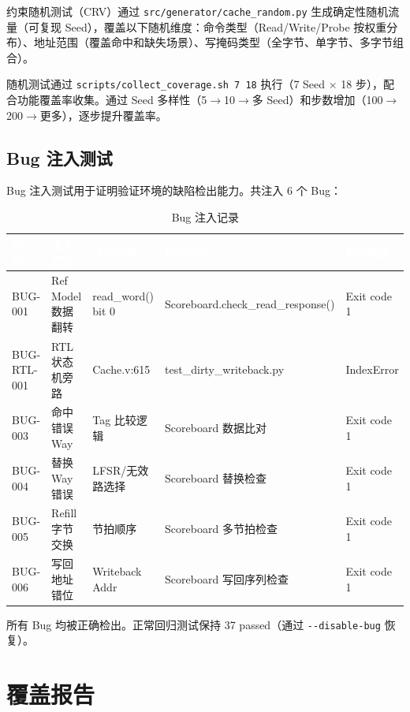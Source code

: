 \documentclass[12pt,a4paper]{ctexart}
\newcommand{\thcell}[1]{\textcolor{white}{\bfseries #1}}
\begin{document}
约束随机测试（CRV）通过 \lstinline{src/generator/cache_random.py} 生成确定性随机流量（可复现 Seed），覆盖以下随机维度：命令类型（Read/Write/Probe 按权重分布）、地址范围（覆盖命中和缺失场景）、写掩码类型（全字节、单字节、多字节组合）。

随机测试通过 \lstinline{scripts/collect_coverage.sh 7 18} 执行（7 Seed $\times$ 18 步），配合功能覆盖率收集。通过 Seed 多样性（5$\rightarrow$10$\rightarrow$多 Seed）和步数增加（100$\rightarrow$200$\rightarrow$更多），逐步提升覆盖率。

\subsection{Bug 注入测试}

Bug 注入测试用于证明验证环境的缺陷检出能力。共注入 6 个 Bug：

\begin{table}[H]
\centering
\caption{Bug 注入记录}
\small
\renewcommand{\arraystretch}{1.2}
\begin{tabular}{@{}p{1.6cm}p{2.6cm}p{2.4cm}p{3cm}p{2cm}@{}}
\toprule
\rowcolor{primaryblue}
\thcell{Bug ID} & \thcell{注入方式} & \thcell{注入位置} & \thcell{检出机制} & \thcell{预期输出} \\
\midrule
\rowcolor{rowgray} BUG-001 & Ref Model 数据翻转 & read\_word() bit 0 & Scoreboard.check\_read\_response() & Exit code 1 \\
BUG-RTL-001 & RTL 状态机旁路 & Cache.v:615 & test\_dirty\_writeback.py & IndexError \\
\rowcolor{rowgray} BUG-003 & 命中错误 Way & Tag 比较逻辑 & Scoreboard 数据比对 & Exit code 1 \\
BUG-004 & 替换 Way 错误 & LFSR/无效路选择 & Scoreboard 替换检查 & Exit code 1 \\
\rowcolor{rowgray} BUG-005 & Refill 字节交换 & 节拍顺序 & Scoreboard 多节拍检查 & Exit code 1 \\
BUG-006 & 写回地址错位 & Writeback Addr & Scoreboard 写回序列检查 & Exit code 1 \\
\bottomrule
\end{tabular}
\end{table}

所有 Bug 均被正确检出。正常回归测试保持 37 passed（通过 \lstinline{--disable-bug} 恢复）。

\newpage

\section{覆盖报告}
\end{document}
